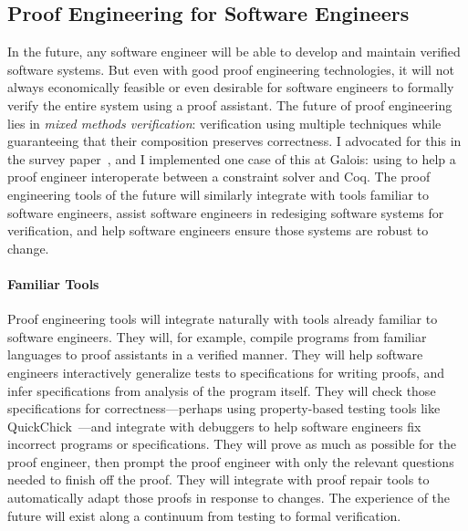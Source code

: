 \subsection*{Proof Engineering for Software Engineers}

In the future, any software engineer will be able to develop and maintain verified software systems.
But even with good proof engineering technologies, it will not always economically feasible or even desirable for software engineers to formally verify 
the entire system using a proof assistant.
The future of proof engineering lies in \textit{mixed methods verification}:
verification using multiple techniques while guaranteeing that their composition preserves correctness.
I advocated for this in the survey paper~\cite{PGL-045}, and I implemented one case of this at Galois: using
\sysnamelong to help a proof engineer interoperate between a constraint solver and Coq.
The proof engineering tools of the future will similarly integrate with tools familiar to software engineers,
assist software engineers in redesiging software systems for verification,
and help software engineers ensure those systems are robust to change.

\paragraph{Familiar Tools}
Proof engineering tools will integrate naturally with tools already familiar to software engineers.
They will, for example, compile programs from familiar languages to proof assistants in a verified manner.
They will help software engineers interactively generalize tests to specifications for writing proofs,
and infer specifications from analysis of the program itself.
They will check those specifications for correctness---perhaps using property-based testing tools 
like QuickChick~\cite{Paraskevopoulou2015, lampropoulos2017generating}---and integrate with debuggers to help software engineers 
fix incorrect programs or specifications.
They will prove as much as possible for the proof engineer, then prompt the proof engineer with only the relevant questions
needed to finish off the proof.
They will integrate with proof repair tools to automatically adapt those proofs in response to changes.
The experience of the future will exist along a continuum from testing to formal verification.

